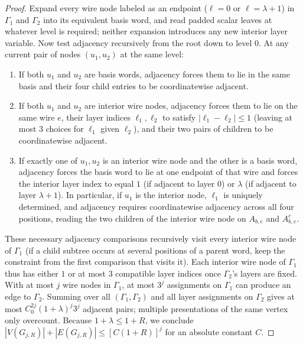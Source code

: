 \begin{proof}
Expand every wire node labeled as an endpoint ($\ell=0$ or $\ell=\lambda+1$) in $\Gamma_1$ and $\Gamma_2$ into its equivalent basis word, and read padded scalar leaves at whatever level is required; neither expansion introduces any new interior layer variable. Now test adjacency recursively from the root down to level $0$. At any current pair of nodes $(u_1,u_2)$ at the same level:
\begin{enumerate}
\item If both $u_1$ and $u_2$ are basis words, adjacency forces them to lie in the same basis and their four child entries to be coordinatewise adjacent.
\item If both $u_1$ and $u_2$ are interior wire nodes, adjacency forces them to lie on the same wire $e$, their layer indices $\ell_1,\ell_2$ to satisfy $|\ell_1-\ell_2|\le1$ (leaving at most $3$ choices for $\ell_1$ given $\ell_2$), and their two pairs of children to be coordinatewise adjacent.
\item If exactly one of $u_1,u_2$ is an interior wire node and the other is a basis word, adjacency forces the basis word to lie at one endpoint of that wire and forces the interior layer index to equal $1$ (if adjacent to layer $0$) or $\lambda$ (if adjacent to layer $\lambda+1$). In particular, if $u_1$ is the interior node, $\ell_1$ is uniquely determined, and adjacency requires coordinatewise adjacency across all four positions, reading the two children of the interior wire node on $A_{b,e}$ and $A_{b,e}^c$.
\end{enumerate}
These necessary adjacency comparisons recursively visit every interior wire node of $\Gamma_1$ (if a child subtree occurs at several positions of a parent word, keep the constraint from the first comparison that visits it). Each interior wire node of $\Gamma_1$ thus has either $1$ or at most $3$ compatible layer indices once $\Gamma_2$'s layers are fixed. With at most $j$ wire nodes in $\Gamma_1$, at most $3^j$ assignments on $\Gamma_1$ can produce an edge to $\Gamma_2$. Summing over all $(\Gamma_1,\Gamma_2)$ and all layer assignments on $\Gamma_2$ gives at most $C_0^{2j}(1+\lambda)^j 3^j$ adjacent pairs; multiple presentations of the same vertex only overcount. Because $1+\lambda\le 1+R$, we conclude $|V(G_{j,R})|+|E(G_{j,R})|\le[C(1+R)]^j$ for an absolute constant $C$.


\end{proof}
